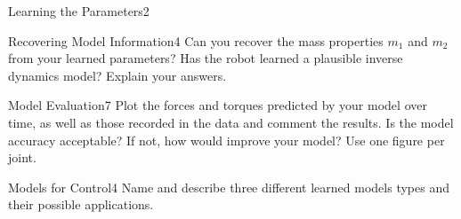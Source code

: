 \begin{questions}
\begin{question}{Learning the Parameters}{2}
\end{question}



\begin{question}{Recovering Model Information}{4}
	Can you recover the mass properties $m_{1}$ and $m_{2}$ from your learned parameters? Has the robot learned a plausible inverse dynamics model? Explain your answers.
	
\begin{answer}\end{answer}
\end{question}



\begin{question}{Model Evaluation}{7}
Plot the forces and torques predicted by your model over time, as well as those recorded in the data and comment the results. Is the model accuracy acceptable? If not, how would improve your model? Use one figure per joint.

\begin{answer}\end{answer}

\end{question}



\begin{question}[bonus]{Models for Control}{4}
Name and describe three different learned models types and their possible applications.

\begin{answer}\end{answer}

\end{question}


\end{questions}
